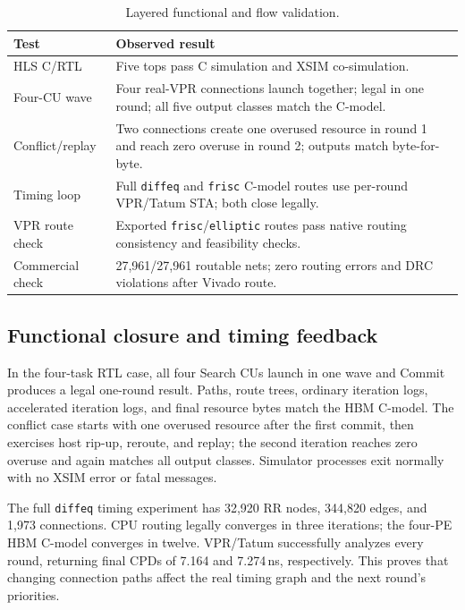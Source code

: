 \documentclass[sigconf,anonymous,review]{acmart}
\begin{document}
\begin{table}[t]
\centering
\small
\begin{tabular}{p{}p{}}
\toprule
Test & Observed result \\
\midrule
HLS C/RTL & Five tops pass C simulation and XSIM co-simulation. \\
Four-CU wave & Four real-VPR connections launch together; legal in one round;
all five output classes match the C-model. \\
Conflict/replay & Two connections create one overused resource in round 1 and
reach zero overuse in round 2; outputs match byte-for-byte. \\
Timing loop & Full \texttt{diffeq} and \texttt{frisc} C-model routes use
per-round VPR/Tatum STA; both close legally. \\
VPR route check & Exported \texttt{frisc}/\texttt{elliptic} routes pass native
routing consistency and feasibility checks. \\
Commercial check & 27,961/27,961 routable nets; zero routing errors and DRC
violations after Vivado route. \\
\bottomrule
\end{tabular}
\caption{Layered functional and flow validation.}
\label{tab:validation}
\end{table}

\subsection{Functional closure and timing feedback}

In the four-task RTL case, all four Search CUs launch in one wave and Commit
produces a legal one-round result. Paths, route trees, ordinary iteration logs,
accelerated iteration logs, and final resource bytes match the HBM C-model.
The conflict case starts with one overused resource after the first commit,
then exercises host rip-up, reroute, and replay; the second iteration reaches
zero overuse and again matches all output classes. Simulator processes exit
normally with no XSIM error or fatal messages.

The full \texttt{diffeq} timing experiment has 32,920 RR nodes, 344,820 edges,
and 1,973 connections. CPU routing legally converges in three iterations; the
four-PE HBM C-model converges in twelve. VPR/Tatum successfully analyzes every
round, returning final CPDs of 7.164 and 7.274\,ns, respectively. This proves
that changing connection paths affect the real timing graph and the next
round's priorities.
\end{document}
